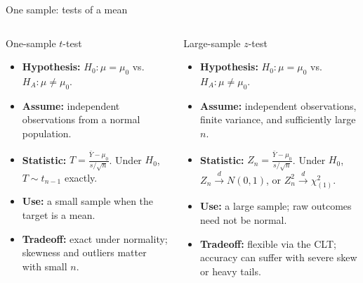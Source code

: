 \documentclass[aspectratio=169,11pt]{beamer}
\begin{document}
\begin{frame}{One sample: tests of a mean}
  \footnotesize
  \begin{columns}[T,onlytextwidth]
      \begin{block}{One-sample \(t\)-test}
        \begin{itemize}
          \item \textbf{Hypothesis:} \(H_0:\mu=\mu_0\) vs.\ \(H_A:\mu\ne\mu_0\).
          \item \textbf{Assume:} independent observations from a normal population.
          \item \textbf{Statistic:} \(\displaystyle T=\frac{\bar Y-\mu_0}{s/\sqrt n}\). Under \(H_0\), \(T\sim t_{n-1}\) exactly.
          \item \textbf{Use:} a small sample when the target is a mean.
          \item \textbf{Tradeoff:} exact under normality; skewness and outliers matter with small \(n\).
        \end{itemize}
      \end{block}
      \begin{block}{Large-sample \(z\)-test}
        \begin{itemize}
          \item \textbf{Hypothesis:} \(H_0:\mu=\mu_0\) vs.\ \(H_A:\mu\ne\mu_0\).
          \item \textbf{Assume:} independent observations, finite variance, and sufficiently large \(n\).
          \item \textbf{Statistic:} \(\displaystyle Z_n=\frac{\bar Y-\mu_0}{s/\sqrt n}\). Under \(H_0\), \(Z_n\xrightarrow{d}N(0,1)\), or \(Z_{n}^2\xrightarrow{d}\chi_{(1)}^2\).
          \item \textbf{Use:} a large sample; raw outcomes need not be normal.
          \item \textbf{Tradeoff:} flexible via the CLT; accuracy can suffer with severe skew or heavy tails.
        \end{itemize}
      \end{block}
  \end{columns}
\end{frame}
\end{document}
